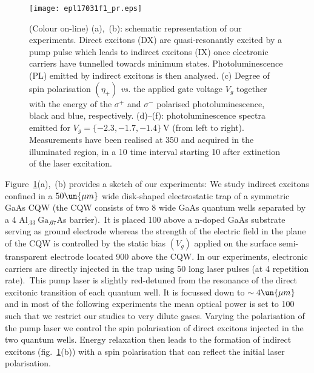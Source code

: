 \documentclass[doublecol,final]{epl2}
\begin{document}
\begin{figure}%
\centering\texttt{[image: epl17031f1\_pr.eps]}
\caption{(Colour on-line) (a),~(b): schematic representation of our experiments. Direct excitons (DX) are quasi-resonantly excited by a pump pulse which leads to indirect excitons (IX) once electronic carriers have tunnelled towards minimum  states. Photoluminescence (PL) emitted by indirect excitons is then analysed. (c) Degree of spin polarisation $(\eta_{+})$ \textit{vs.} the applied gate voltage $V_{g}$ together with the energy of the $\sigma^{+}$ and $\sigma^{-}$ polarised photoluminescence, black and blue, respectively. (d)--(f): photoluminescence spectra emitted for $V_g= \{-2.3,-1.7,-1.4\}\ \mathrm{V}$ (from left to right). Measurements have been realised at 350 and acquired in the illuminated region, in a 10 time interval starting 10 after extinction of the laser excitation.}\label{epl17031fig1}
\end{figure}

Figure~\ref{epl17031fig1}(a),~(b) provides a sketch of our experiments: We study indirect excitons confined in a $50\un{\mu m}$ wide disk-shaped electrostatic trap of a symmetric GaAs CQW (the CQW consists of two 8 wide GaAs quantum wells separated by a 4 $\mathrm{Al}_{.33}\ \mathrm{Ga}_{.67}$As barrier).~It is placed 100 above a n-doped GaAs substrate serving as ground electrode whereas the strength of the electric field in the plane of the CQW is controlled by the static bias $(V_g)$ applied on the surface semi-transparent electrode located 900 above the CQW. In our experiments, electronic carriers are directly injected in the trap using 50 long laser pulses (at 4 repetition rate).~This pump laser is slightly red-detuned from the resonance of the direct excitonic transition of each quantum well. It is focussed down to $\sim 4\un{\mu m}$ and in most of the following experiments the mean optical power is set to 100 such that we restrict our studies to very dilute gases. Varying the polarisation of the pump laser we control the spin polarisation of direct excitons injected in the two quantum wells. Energy relaxation then leads to the formation of indirect excitons (fig.~\ref{epl17031fig1}(b)) with a spin polarisation that can reflect the initial laser polarisation.
\end{document}
